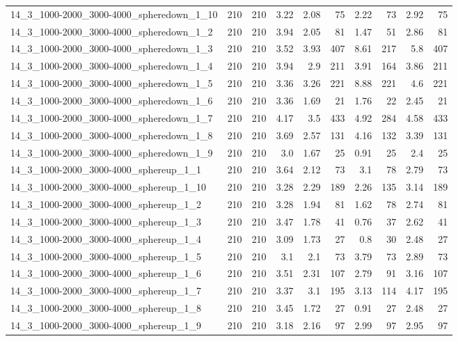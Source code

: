 \begin{center}
\begin{scriptsize}
\begin{longtable}{lrrrrrrrrr}
14\_3\_1000-2000\_3000-4000\_spheredown\_1\_10 & 210 & 210 & 3.22 & 2.08 & 75 & 2.22 & 73 & 2.92 & 75\\
14\_3\_1000-2000\_3000-4000\_spheredown\_1\_2 & 210 & 210 & 3.94 & 2.05 & 81 & 1.47 & 51 & 2.86 & 81\\
14\_3\_1000-2000\_3000-4000\_spheredown\_1\_3 & 210 & 210 & 3.52 & 3.93 & 407 & 8.61 & 217 & 5.8 & 407\\
14\_3\_1000-2000\_3000-4000\_spheredown\_1\_4 & 210 & 210 & 3.94 & 2.9 & 211 & 3.91 & 164 & 3.86 & 211\\
14\_3\_1000-2000\_3000-4000\_spheredown\_1\_5 & 210 & 210 & 3.36 & 3.26 & 221 & 8.88 & 221 & 4.6 & 221\\
14\_3\_1000-2000\_3000-4000\_spheredown\_1\_6 & 210 & 210 & 3.36 & 1.69 & 21 & 1.76 & 22 & 2.45 & 21\\
14\_3\_1000-2000\_3000-4000\_spheredown\_1\_7 & 210 & 210 & 4.17 & 3.5 & 433 & 4.92 & 284 & 4.58 & 433\\
14\_3\_1000-2000\_3000-4000\_spheredown\_1\_8 & 210 & 210 & 3.69 & 2.57 & 131 & 4.16 & 132 & 3.39 & 131\\
14\_3\_1000-2000\_3000-4000\_spheredown\_1\_9 & 210 & 210 & 3.0 & 1.67 & 25 & 0.91 & 25 & 2.4 & 25\\
14\_3\_1000-2000\_3000-4000\_sphereup\_1\_1 & 210 & 210 & 3.64 & 2.12 & 73 & 3.1 & 78 & 2.79 & 73\\
14\_3\_1000-2000\_3000-4000\_sphereup\_1\_10 & 210 & 210 & 3.28 & 2.29 & 189 & 2.26 & 135 & 3.14 & 189\\
14\_3\_1000-2000\_3000-4000\_sphereup\_1\_2 & 210 & 210 & 3.28 & 1.94 & 81 & 1.62 & 78 & 2.74 & 81\\
14\_3\_1000-2000\_3000-4000\_sphereup\_1\_3 & 210 & 210 & 3.47 & 1.78 & 41 & 0.76 & 37 & 2.62 & 41\\
14\_3\_1000-2000\_3000-4000\_sphereup\_1\_4 & 210 & 210 & 3.09 & 1.73 & 27 & 0.8 & 30 & 2.48 & 27\\
14\_3\_1000-2000\_3000-4000\_sphereup\_1\_5 & 210 & 210 & 3.1 & 2.1 & 73 & 3.79 & 73 & 2.89 & 73\\
14\_3\_1000-2000\_3000-4000\_sphereup\_1\_6 & 210 & 210 & 3.51 & 2.31 & 107 & 2.79 & 91 & 3.16 & 107\\
14\_3\_1000-2000\_3000-4000\_sphereup\_1\_7 & 210 & 210 & 3.37 & 3.1 & 195 & 3.13 & 114 & 4.17 & 195\\
14\_3\_1000-2000\_3000-4000\_sphereup\_1\_8 & 210 & 210 & 3.45 & 1.72 & 27 & 0.91 & 27 & 2.48 & 27\\
14\_3\_1000-2000\_3000-4000\_sphereup\_1\_9 & 210 & 210 & 3.18 & 2.16 & 97 & 2.99 & 97 & 2.95 & 97\\

\end{longtable}
\end{scriptsize}
\end{center}
